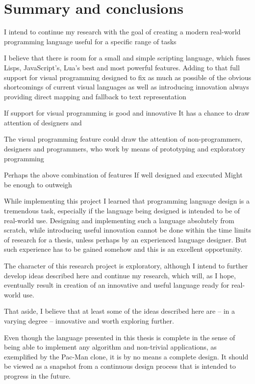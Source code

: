 \chapter{Summary and conclusions}\label{chap:summary}
I intend to continue my research with the goal of creating a modern real-world
programming language useful for a specific range of tasks

I believe that there is room for a small and simple scripting language, which fuses Lisps, JavaScript's, Lua's best and most powerful features. Adding to that full support for visual programming designed to fix as much as possible of the obvious shortcomings of current visual languages as well as introducing innovation always providing direct mapping and fallback to text representation  

If support for visual programming is good and innovative
It has a chance to draw attention of designers and 

The visual programming feature could draw the attention of non-programmers, designers and programmers, who work by means of prototyping and exploratory programming

Perhaps the above combination of features
If well designed and executed
Might be enough to outweigh \cite{pl_checklist}


While implementing this project I learned that programming language design is a
tremendous task, especially if the language being designed is intended to be of
real-world use. Designing and implementing such a language absolutely from
scratch, while introducing useful innovation cannot be done within the time
limits of research for a thesis, unless perhaps by an experienced language
designer. But such experience has to be gained somehow and this is an excellent
opportunity.

The character of this research project is exploratory, although I intend to
further develop ideas described here and continue my research, which will, as I
hope, eventually result in creation of an innovative and useful language ready
for real-world use.

That aside, I believe that at least some of the ideas described here are -- in a
varying degree -- innovative and worth exploring further.

Even though the language presented in this thesis is complete in the sense of
being able to implement any algorithm and non-trivial applications, as
exemplified by the Pac-Man clone, it is by no means a complete design. It should
be viewed as a snapshot from a continuous design process that is intended to
progress in the future.